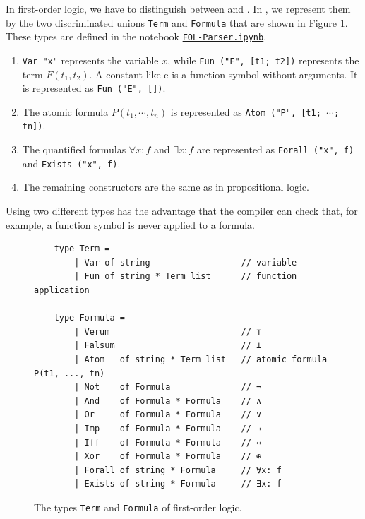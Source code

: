 In first-order logic, we have to distinguish between  and .  In \Fsharp, we represent
them by the two discriminated unions \texttt{Term} and \texttt{Formula} that are shown in Figure
\ref{fig:fol-types}.  These types are defined in the notebook
\href{https://github.com/karlstroetmann/Logic/blob/master/F-Sharp/Chapter-5/FOL-Parser.ipynb}{\texttt{FOL-Parser.ipynb}}.
\begin{enumerate}
\item \texttt{Var "x"} represents the variable $x$, while \texttt{Fun ("F", [t1; t2])} represents the term
      $F(t_1, t_2)$.  A constant like $\mathrm{e}$ is a function symbol without arguments.  It is represented as
      \texttt{Fun ("E", [])}.
\item The atomic formula $P(t_1, \cdots, t_n)$ is represented as \texttt{Atom ("P", [t1; $\cdots$; tn])}.
\item The quantified formulas $\forall x: f$ and $\exists x: f$ are represented as \texttt{Forall ("x", f)} and
      \texttt{Exists ("x", f)}.
\item The remaining constructors are the same as in propositional logic.
\end{enumerate}
Using two different types has the advantage that the \Fsharp{} compiler can check that, for example, a
function symbol is never applied to a formula.

\begin{figure}[!ht]
\centering
\begin{verbatim}
    type Term =
        | Var of string                  // variable
        | Fun of string * Term list      // function application

    type Formula =
        | Verum                          // ⊤
        | Falsum                         // ⊥
        | Atom   of string * Term list   // atomic formula P(t1, ..., tn)
        | Not    of Formula              // ¬
        | And    of Formula * Formula    // ∧
        | Or     of Formula * Formula    // ∨
        | Imp    of Formula * Formula    // →
        | Iff    of Formula * Formula    // ↔
        | Xor    of Formula * Formula    // ⊕
        | Forall of string * Formula     // ∀x: f
        | Exists of string * Formula     // ∃x: f
\end{verbatim}
\vspace*{-0.3cm}
\caption{The types \texttt{Term} and \texttt{Formula} of first-order logic.}
\label{fig:fol-types}
\end{figure}

